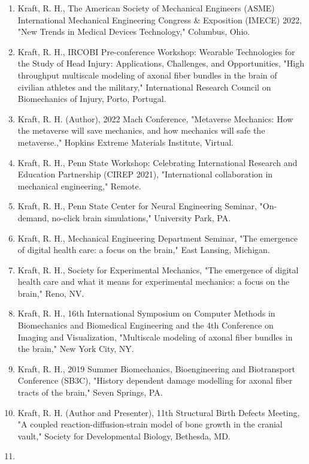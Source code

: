 \documentclass[
]{article}
\begin{document}
\begin{enumerate}
\def\labelenumi{\arabic{enumi}.}
\item
  Kraft, R. H., The American Society of Mechanical Engineers (ASME)
  International Mechanical Engineering Congress \& Exposition (IMECE)
  2022, "New Trends in Medical Devices Technology," Columbus, Ohio.
\item
  Kraft, R. H., IRCOBI Pre-conference Workshop: Wearable Technologies
  for the Study of Head Injury: Applications, Challenges, and
  Opportunities, "High throughput multiscale modeling of axonal fiber
  bundles in the brain of civilian athletes and the military,"
  International Research Council on Biomechanics of Injury, Porto,
  Portugal.
\item
  Kraft, R. H. (Author), 2022 Mach Conference, "Metaverse Mechanics: How
  the metaverse will save mechanics, and how mechanics will safe the
  metaverse.," Hopkins Extreme Materials Institute, Virtual.
\item
  Kraft, R. H., Penn State Workshop: Celebrating International Research
  and Education Partnership (CIREP 2021), "International collaboration
  in mechanical engineering," Remote.
\item
  Kraft, R. H., Penn State Center for Neural Engineering Seminar,
  "On-demand, no-click brain simulations," University Park, PA.
\item
  Kraft, R. H., Mechanical Engineering Department Seminar, "The
  emergence of digital health care: a focus on the brain," East Lansing,
  Michigan.
\item
  Kraft, R. H., Society for Experimental Mechanics, "The emergence of
  digital health care and what it means for experimental mechanics: a
  focus on the brain," Reno, NV.
\item
  Kraft, R. H., 16th International Symposium on Computer Methods in
  Biomechanics and Biomedical Engineering and the 4th Conference on
  Imaging and Visualization, "Multiscale modeling of axonal fiber
  bundles in the brain," New York City, NY.
\item
  Kraft, R. H., 2019 Summer Biomechanics, Bioengineering and
  Biotransport Conference (SB3C), "History dependent damage modelling
  for axonal fiber tracts of the brain," Seven Springs, PA.
\item
  Kraft, R. H. (Author and Presenter), 11th Structural Birth Defects
  Meeting, "A coupled reaction-diffusion-strain model of bone growth in
  the cranial vault," Society for Developmental Biology, Bethesda, MD.
\item

\end{enumerate}
\end{document}
